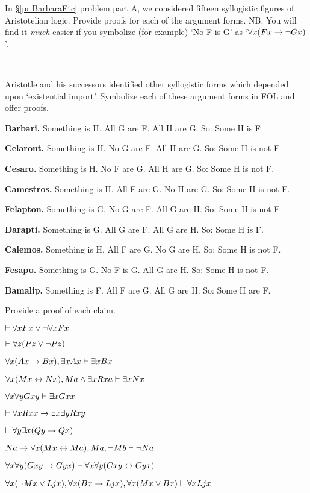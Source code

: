 \problempart
\label{pr.BarbaraEtc.proof1}
In \S\ref{pr.BarbaraEtc} problem part A, we considered fifteen syllogistic figures of Aristotelian logic. Provide proofs for each of the argument forms. NB: You will find it \emph{much} easier if you symbolize (for example) `No F is G' as `$\forall x (Fx \rightarrow \neg Gx)$'.

\

\problempart
\label{pr.BarbaraEtc.proof2}
Aristotle and his successors identified other syllogistic forms which depended upon `existential import'. Symbolize each of these argument forms in FOL and offer proofs.
\begin{ebullet}
	\item \textbf{Barbari.} Something is H. All G are F. All H are G. So: Some H is F
	\item \textbf{Celaront.} Something is H. No G are F. All H are G. So: Some H is not F
	\item \textbf{Cesaro.} Something is H. No F are G. All H are G. So: Some H is not F.
	\item \textbf{Camestros.} Something is H. All F are G. No H are G. So: Some H is not F.
	\item \textbf{Felapton.} Something is G. No G are F. All G are H. So: Some H is not F.
	\item \textbf{Darapti.} Something is G. All G are F. All G are H. So: Some H is F.
	\item \textbf{Calemos.} Something is H. All F are G. No G are H. So: Some H is not F.
	\item \textbf{Fesapo.} Something is G. No F is G. All G are H. So: Some H is not F.
	\item \textbf{Bamalip.} Something is F. All F are G. All G are H. So: Some H are F.
\end{ebullet}

\problempart
\label{pr.someFOLproofs}
Provide a proof of each claim.
\begin{earg}
\item $\vdash \forall x Fx \vee \neg \forall x Fx$
\item $\vdash\forall z (Pz \vee \neg Pz)$
\item $\forall x(Ax\rightarrow Bx), \exists x Ax \vdash \exists x Bx$
\item $\forall x(Mx \leftrightarrow Nx), Ma\wedge\exists x Rxa\vdash \exists x Nx$
\item $\forall x \forall y Gxy\vdash\exists x Gxx$
\item $\vdash\forall x Rxx\rightarrow \exists x \exists y Rxy$
\item $\vdash\forall y \exists x (Qy \rightarrow Qx)$
\item $Na \rightarrow \forall x(Mx \leftrightarrow Ma), Ma, \neg Mb\vdash \neg Na$
\item $\forall x \forall y (Gxy \rightarrow Gyx) \vdash \forall x\forall y (Gxy \leftrightarrow Gyx)$
\item $\forall x(\neg Mx \vee Ljx), \forall x(Bx\rightarrow Ljx), \forall x(Mx\vee Bx)\vdash \forall xLjx$
\end{earg}

